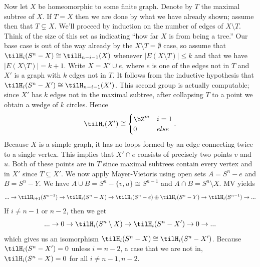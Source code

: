 \begin{homework}[e]
\begin{prf}
    Now let $X$ be homeomorphic to some finite graph. Denote by $T$ the maximal subtree of $X$. If $T = X$ then we are done by what we have already shown; assume then that $T \subsetneq X$. We'll proceed by induction on the number of edges of $X \setminus T$. Think of the size of this set as indicating ``how far $X$ is from being a tree.'' Our base case is out of the way already by the $X\setminus T = \emptyset$ case, so assume that $\tilH_i(S^n - X) \cong \tilH_{n-i-1}(X)$ whenever $|E(X\setminus T)| \leq k$ and that we have $|E(X\setminus T)| = k + 1$. Write $X = X' \cup e$, where $e$ is one of the edges not in $T$ and $X'$ is a graph with $k$ edges not in $T$. It follows from the inductive hypothesis that $\tilH_i(S^n - X') \cong \tilH_{n-i-1}(X')$. This second group is actually computable; since $X'$ has $k$ edges not in the maximal subtree, after collapsing $T$ to a point we obtain a wedge of $k$ circles. Hence
    \begin{align*}
      \tilH_{i}(X') \cong
      \begin{cases}
        \bZ^m & i = 1 \\
        0 & else
      \end{cases}.
    \end{align*}
    Because $X$ is a simple graph, it has no loops formed by an edge connecting twice to a single vertex. This implies that $X' \cap e$ consists of precisely two points $v$ and $u$. Both of these points are in $T$ since maximal subtrees contain every vertex and in $X'$ since $T \subseteq X'$. We now apply Mayer-Vietoris using open sets $A = S^n - e$ and $B = S^n - Y$. We have $A\cup B = S^n - \{v,u\} \cong S^{n-1}$ and $A\cap B = S^n \setminus X$. MV yields
    \begin{align*}
      ... \to \tilH_{i+1}(S^{n-1}) \to \tilH_i(S^n - X) \to \tilH_i(S^n - e) \oplus \tilH_i(S^n - Y) \to \tilH_i(S^{n-1})\to ...
    \end{align*}
    If $i \neq n-1$ or $n-2$, then we get
    \begin{align*}
      ...\to 0 \to \tilH_i(S^n \setminus X) \to \tilH_i(S^n - X') \to 0 \to ...
    \end{align*}
    which gives us an isomorphism $\tilH_i(S^n - X)\cong \tilH_i(S^n- X')$. Because $\tilH_i(S^n - X') = 0$ unless $i = n-2$, a case that we are not in, $\tilH_i(S^n - X) = 0$ for all $i \neq n - 1, n - 2$.


\end{prf}
\end{homework}
